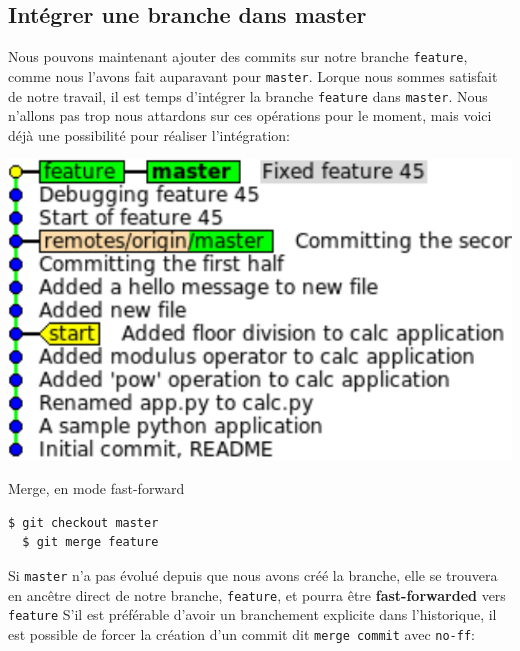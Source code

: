 \documentclass{../../common/tufte-latex/tufte-handout}
\begin{document}
\subsection{Intégrer une branche dans master}

Nous pouvons maintenant ajouter des commits sur notre branche \texttt{feature}, comme nous l'avons fait auparavant pour \texttt{master}.
Lorque nous sommes satisfait de notre travail, il est temps d'intégrer la branche \texttt{feature} dans \texttt{master}.
Nous n'allons pas trop nous attardons sur ces opérations pour le moment, mais voici déjà une possibilité pour réaliser l'intégration:

\begin{marginfigure}%
  \centering
  \includegraphics[width=\linewidth]{gitmerge-ff.pdf}
  \label{fig:gitmerge-ff}
  \caption{Merge, en mode fast-forward}
\end{marginfigure}

\begin{lstlisting}[style=BashInputStyle]
  $ git checkout master
  $ git merge feature
\end{lstlisting}

Si \texttt{master} n'a pas évolué depuis que nous avons créé la branche, elle se trouvera en ancêtre direct de notre branche, \texttt{feature}, et pourra être \textbf{fast-forwarded} vers \texttt{feature}
S'il est préférable d'avoir un branchement explicite dans l'historique, il est possible de forcer la création d'un commit dit \texttt{merge commit} avec \texttt{no-ff}:
\end{document}

